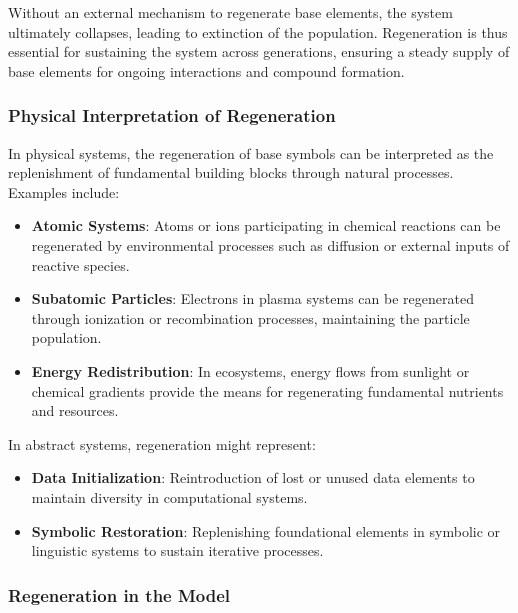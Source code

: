 \documentclass[entropy,article,submit,pdftex,moreauthors]{Definitions/mdpi}
\begin{document}
Without an external mechanism to regenerate base elements, the system ultimately collapses, leading to extinction of the population. Regeneration is thus essential for sustaining the system across generations, ensuring a steady supply of base elements for ongoing interactions and compound formation.

\subsubsection{Physical Interpretation of Regeneration}

In physical systems, the regeneration of base symbols can be interpreted as the replenishment of fundamental building blocks through natural processes. Examples include:
\begin{itemize}
    \item \textbf{Atomic Systems}: Atoms or ions participating in chemical reactions can be regenerated by environmental processes such as diffusion or external inputs of reactive species.
    \item \textbf{Subatomic Particles}: Electrons in plasma systems can be regenerated through ionization or recombination processes, maintaining the particle population.
    \item \textbf{Energy Redistribution}: In ecosystems, energy flows from sunlight or chemical gradients provide the means for regenerating fundamental nutrients and resources.
\end{itemize}

In abstract systems, regeneration might represent:
\begin{itemize}
    \item \textbf{Data Initialization}: Reintroduction of lost or unused data elements to maintain diversity in computational systems.
    \item \textbf{Symbolic Restoration}: Replenishing foundational elements in symbolic or linguistic systems to sustain iterative processes.
\end{itemize}

\subsubsection{Regeneration in the Model}
\end{document}
